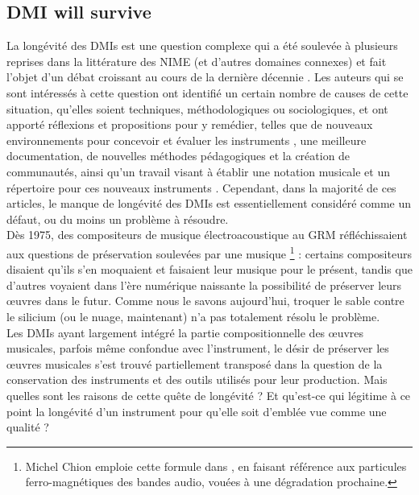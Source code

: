 \subsection{DMI will survive}

\noindent La longévité des \glspl{DMI} est une question complexe qui a été soulevée à plusieurs reprises dans la littérature des \gls{NIME} (et d'autres domaines connexes) et fait l'objet d'un débat croissant au cours de la dernière décennie \cite{baguyos_contemporary_2014, morreale_design_2017,bonardi_preservation_2008}. Les auteurs qui se sont intéressés à cette question ont identifié un certain nombre de causes de cette situation, qu'elles soient techniques, méthodologiques ou sociologiques, et ont apporté réflexions et propositions pour y remédier, telles que de nouveaux environnements pour concevoir et évaluer les instruments \cite{jorda_digital_2004, morreale_design_2017}, une meilleure documentation, de nouvelles méthodes pédagogiques et la création de communautés, ainsi qu'un travail visant à établir une notation musicale et un répertoire pour ces nouveaux instruments \cite{mamedes_composing_2014,mays_notation_2014}. Cependant, dans la majorité de ces articles, le manque de longévité des \glspl{DMI} est essentiellement considéré comme un défaut, ou du moins un problème à résoudre.\\
\indent Dès 1975, des compositeurs de musique électroacoustique au \gls{GRM} réfléchissaient aux questions de préservation soulevées par une musique \footnote{Michel Chion emploie cette formule dans \cite{chion_musique_1977}, en faisant référence aux particules ferro-magnétiques des bandes audio, vouées à une dégradation prochaine.} : certains compositeurs disaient qu'ils s'en moquaient et faisaient leur musique pour le présent, tandis que d'autres voyaient dans l'ère numérique naissante la possibilité de préserver leurs œuvres dans le futur. Comme nous le savons aujourd'hui, troquer le sable contre le silicium (ou le nuage, maintenant) n'a pas totalement résolu le problème.\\
\indent Les \glspl{DMI} ayant largement intégré la partie compositionnelle des œuvres musicales, parfois même confondue avec l'instrument, le désir de préserver les œuvres musicales s'est trouvé partiellement transposé dans la question de la conservation des instruments et des outils utilisés pour leur production. Mais quelles sont les raisons de cette quête de longévité ? Et qu’est-ce qui légitime à ce point la longévité d’un instrument pour qu’elle soit d’emblée vue comme une qualité ?\\
